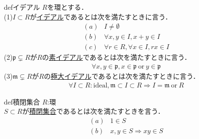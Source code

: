 \documentclass[11pt]{jsarticle}
\newcommand{\mf}[1]{\mathfrak{#1}} %
\begin{document}
\begin{statesp}{def}{イデアル}
    $R$を環とする．\\
    (1)$I \subset R$が\underline{イデアル}であるとは次を満たすときに言う．
    \begin{align}
        (a) & I \neq \emptyset                           \\
        (b) & \forall x,y \in I, x+y \in I               \\
        (c) & \forall r \in R, \forall x \in I, rx \in I
    \end{align}
    (2)$\mf{p} \subsetneq R$が$R$の\underline{素イデアル}であるとは次を満たすときに言う．
    \begin{align}
        \forall x,y \in \mf{p}, x \in \mf{p} ~ \mathrm{or} ~ y \in \mf{p}
    \end{align}
    (3)$\mf{m} \subsetneq R$が$R$の\underline{極大イデアル}であるとは次を満たすときに言う．
    \begin{align}
        \forall I \subset R :\mathrm{ideal}, \mf{m} \subset I \subset R \Rightarrow I = \mf{m} ~ \mathrm{or} ~ R
    \end{align}
\end{statesp}

\begin{statesp}{def}{積閉集合}
    $R$:環\\
    $S \subset R$が\underline{積閉集合}であるとは次を満たすときを言う．
    \begin{align}
        (a) & 1 \in S                        \\
        (b) & x,y \in S \Rightarrow xy \in S
    \end{align}
\end{statesp}
\end{document}
